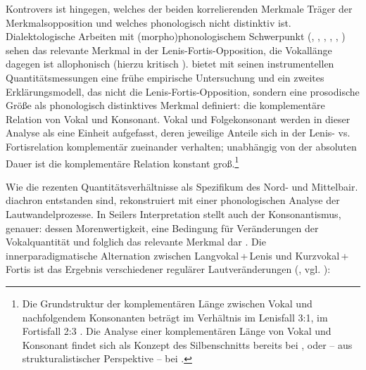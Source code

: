 Kontrovers ist hingegen, welches der beiden korrelierenden Merkmale Träger der Merkmalsopposition und welches phonologisch nicht distinktiv ist. Dialektologische Arbeiten mit (morpho)phonologischem Schwerpunkt (\citealt{Dozauer1967}, \citealt{HarnischRowley1990}, \citealt{Hinderling1980}, \citealt{Kufner1957}, \citealt{Rowley1997}, \citealt{Wiesinger1990}) sehen das relevante Merkmal in der Lenis-Fortis-Opposition, die Vokallänge dagegen ist allophonisch (hierzu kritisch \citealt[355]{MoosmüllerScheutz2018}). \citet{Bannert1976} bietet mit seinen instrumentellen Quantitätsmessungen eine frühe empirische Untersuchung und ein zweites Erklärungsmodell, das nicht die Lenis-Fortis-Opposition, sondern eine prosodische Größe als phonologisch distinktives Merkmal definiert: die komplementäre Relation von Vokal und Konsonant. Vokal und Folgekonsonant werden in dieser Analyse als eine Einheit aufgefasst, deren jeweilige Anteile sich in der Lenis- vs. Fortisrelation komplementär zueinander verhalten; unabhängig von der absoluten Dauer ist die komplementäre Relation konstant groß.\footnote{Die Grundstruktur der komplementären Länge zwischen Vokal und nachfolgendem Konsonanten beträgt im Verhältnis im Lenisfall 3:1, im Fortisfall 2:3 \citep[87]{Bannert1976}. Die Analyse einer komplementären Länge von Vokal und Konsonant findet sich als Konzept des Silbenschnitts bereits bei \citet{Sievers1976}, \citet{Pfalz1913} oder -- aus strukturalistischer Perspektive -- bei \citet{Trubetzkoy1977}.}

Wie die rezenten Quantitätsverhältnisse als Spezifikum des Nord- und Mittelbair. diachron entstanden sind, rekonstruiert \citet{Seiler2005, Seiler2008, Seiler2009} mit einer phonologischen Analyse der Lautwandelprozesse. In Seilers Interpretation stellt auch der Konsonantismus, genauer: dessen Morenwertigkeit, eine Bedingung für Veränderungen der Vokalquantität und folglich das relevante Merkmal dar \citep[267]{Seiler2009}. Die innerparadigmatische Alternation zwischen Lang\-vo\-kal\,+\,Le\-nis und Kurz\-vo\-kal\,+\,For\-tis ist das Ergebnis verschiedener regulärer Lautveränderungen (\cites[187]{Seiler2008}[244--245]{Seiler2009}, vgl. \citealt[§34k2-3]{Kranzmayer1956}):\largerpage

